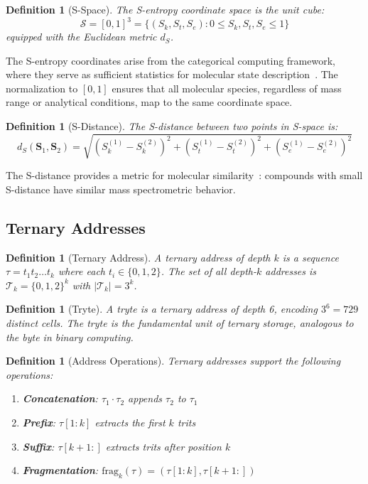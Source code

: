 \documentclass[twocolumn,10pt]{article}
\newtheorem{definition}[theorem]{Definition}
\begin{document}
\begin{definition}[S-Space]
The S-entropy coordinate space is the unit cube:
\begin{equation}
\mathcal{S} = [0,1]^3 = \{(S_k, S_t, S_e) : 0 \leq S_k, S_t, S_e \leq 1\}
\end{equation}
equipped with the Euclidean metric $d_S$.
\end{definition}

The S-entropy coordinates arise from the categorical computing framework, where they serve as sufficient statistics for molecular state description~\cite{shannon1948mathematical, jaynes1957information}. The normalization to $[0,1]$ ensures that all molecular species, regardless of mass range or analytical conditions, map to the same coordinate space.

\begin{definition}[S-Distance]
The S-distance between two points in S-space is:
\begin{equation}
d_S(\mathbf{S}_1, \mathbf{S}_2) = \sqrt{(S_k^{(1)} - S_k^{(2)})^2 + (S_t^{(1)} - S_t^{(2)})^2 + (S_e^{(1)} - S_e^{(2)})^2}
\end{equation}
\end{definition}

The S-distance provides a metric for molecular similarity~\cite{cover2006elements}: compounds with small S-distance have similar mass spectrometric behavior.

\subsection{Ternary Addresses}

\begin{definition}[Ternary Address]
A ternary address of depth $k$ is a sequence $\tau = t_1 t_2 \ldots t_k$ where each $t_i \in \{0, 1, 2\}$. The set of all depth-$k$ addresses is $\mathcal{T}_k = \{0, 1, 2\}^k$ with $|\mathcal{T}_k| = 3^k$.
\end{definition}

\begin{definition}[Tryte]
A tryte is a ternary address of depth 6, encoding $3^6 = 729$ distinct cells. The tryte is the fundamental unit of ternary storage, analogous to the byte in binary computing.
\end{definition}

\begin{definition}[Address Operations]
Ternary addresses support the following operations:
\begin{enumerate}
\item \textbf{Concatenation}: $\tau_1 \cdot \tau_2$ appends $\tau_2$ to $\tau_1$
\item \textbf{Prefix}: $\tau[1:k]$ extracts the first $k$ trits
\item \textbf{Suffix}: $\tau[k+1:]$ extracts trits after position $k$
\item \textbf{Fragmentation}: $\text{frag}_k(\tau) = (\tau[1:k], \tau[k+1:])$
\end{enumerate}
\end{definition}
\end{document}
